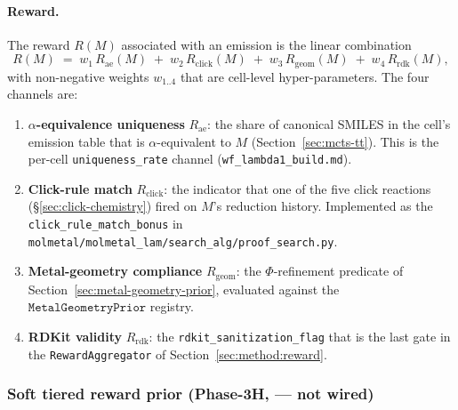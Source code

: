 \paragraph{Reward.}
The reward $R(M)$ associated with an emission is the linear
combination
\begin{equation}
  \label{eq:mcts-reward}
  R(M) \;=\; w_{1}\, R_{\mathrm{ae}}(M) \;+\; w_{2}\, R_{\mathrm{click}}(M)
           \;+\; w_{3}\, R_{\mathrm{geom}}(M) \;+\; w_{4}\, R_{\mathrm{rdk}}(M),
\end{equation}
with non-negative weights $w_{1..4}$ that are cell-level
hyper-parameters.  The four channels are:
\begin{enumerate}
  \item \textbf{$\alpha$-equivalence uniqueness} $R_{\mathrm{ae}}$:
    the share of canonical SMILES in the cell's emission
    table that is $\alpha$-equivalent to $M$ (Section~\ref{sec:mcts-tt}).
    This is the per-cell \texttt{uniqueness\_rate} channel
    (\texttt{wf\_lambda1\_build.md}).
  \item \textbf{Click-rule match} $R_{\mathrm{click}}$: the
    indicator that one of the five click reactions
    (\S\ref{sec:click-chemistry}) fired on $M$'s reduction
    history.  Implemented as the
    \texttt{click\_rule\_match\_bonus} in
    \texttt{molmetal/molmetal\_lam/search\_alg/proof\_search.py}.
  \item \textbf{Metal-geometry compliance}
    $R_{\mathrm{geom}}$: the
    $\Phi$-refinement predicate of
    Section~\ref{sec:metal-geometry-prior}, evaluated against
    the $\texttt{MetalGeometryPrior}$ registry.
  \item \textbf{RDKit validity} $R_{\mathrm{rdk}}$: the
    \texttt{rdkit\_sanitization\_flag} that is the last gate
    in the
    \texttt{RewardAggregator} of Section~\ref{sec:method:reward}.
\end{enumerate}

\subsubsection{Soft tiered reward prior (Phase-3H, \DESIGN{} --- not wired)}
\label{sec:mcts-soft-reward-prior}

